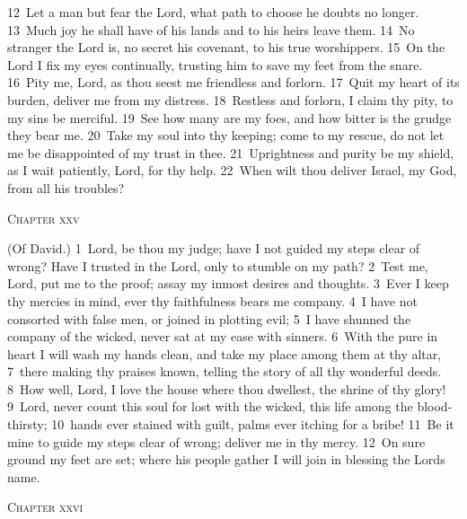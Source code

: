 \documentclass[10pt]{book} %
\begin{document}
\textcolor{benred8}{12}~Let a man but fear the Lord, what path to choose he doubts no longer. \textcolor{benred8}{13}~Much joy he shall have of his lands and to his heirs leave them. \textcolor{benred8}{14}~No stranger the Lord is, no secret his covenant, to his true worshippers. \textcolor{benred8}{15}~On the Lord I fix my eyes continually, trusting him to save my feet from the snare. \textcolor{benred8}{16}~Pity me, Lord, as thou seest me friendless and forlorn. \textcolor{benred8}{17}~Quit my heart of its burden, deliver me from my distress. \textcolor{benred8}{18}~Restless and forlorn, I claim thy pity, to my sins be merciful. \textcolor{benred8}{19}~See how many are my foes, and how bitter is the grudge they bear me. \textcolor{benred8}{20}~Take my soul into thy keeping; come to my rescue, do not let me be disappointed of my trust in thee. \textcolor{benred8}{21}~Uprightness and purity be my shield, as I wait patiently, Lord, for thy help. \textcolor{benred8}{22}~When wilt thou deliver Israel, my God, from all his troubles?
\begin{large}\begin{center}\textsc{Chapter xxv}\end{center}\end{large}
(Of David.)
\textcolor{benred8}{1}~Lord, be thou my judge; have I not guided my steps clear of wrong? Have I trusted in the Lord, only to stumble on my path? \textcolor{benred8}{2}~Test me, Lord, put me to the proof; assay my inmost desires and thoughts. \textcolor{benred8}{3}~Ever I keep thy mercies in mind, ever thy faithfulness bears me company. \textcolor{benred8}{4}~I have not consorted with false men, or joined in plotting evil; \textcolor{benred8}{5}~I have shunned the company of the wicked, never sat at my ease with sinners. \textcolor{benred8}{6}~With the pure in heart I will wash my hands clean, and take my place among them at thy altar, \textcolor{benred8}{7}~there making thy praises known, telling the story of all thy wonderful deeds. \textcolor{benred8}{8}~How well, Lord, I love the house where thou dwellest, the shrine of thy glory! \textcolor{benred8}{9}~Lord, never count this soul for lost with the wicked, this life among the blood-thirsty; \textcolor{benred8}{10}~hands ever stained with guilt, palms ever itching for a bribe! \textcolor{benred8}{11}~Be it mine to guide my steps clear of wrong; deliver me in thy mercy. \textcolor{benred8}{12}~On sure ground my feet are set; where his people gather I will join in blessing the Lord\textquotesingle s name.
\begin{large}\begin{center}\textsc{Chapter xxvi}\end{center}\end{large}
\end{document}
